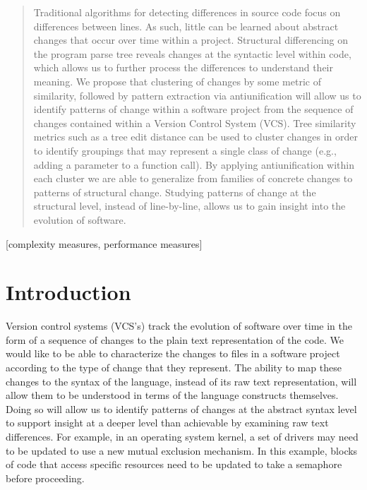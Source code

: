 \documentclass{acm_proc_article-sp}
\begin{document}
\maketitle
\begin{abstract}

Traditional algorithms for detecting differences in source code focus on
differences between lines.  As such, little can be learned about abstract
changes that occur over time within a project.  Structural differencing on the
program parse tree reveals changes at the syntactic level within code, which
allows us to further process the differences to understand their meaning. We
propose that clustering of changes by some metric of similarity, followed by
pattern extraction via antiunification will allow us to identify patterns of
change  within a software project from the sequence of changes contained
within a Version Control System (VCS). Tree similarity metrics such as a tree
edit distance can be used to cluster changes in order to identify groupings
that may represent a single class of change (e.g., adding a
parameter to a function call). By applying antiunification within each cluster
we are able to generalize from families of concrete changes to patterns of
structural change. Studying patterns of change at the structural level,
instead of line-by-line, allows us to gain insight into the evolution of
software.

\end{abstract}

[complexity measures, performance measures]



\section{Introduction}

Version control systems (VCS's) track the evolution of software over time in the form
of a sequence of changes to the plain text representation of the code.
We would like to be able to characterize the changes to files in a software
project according to the type of change that they represent.  The ability to
map these changes to the syntax of the language, instead of its raw text
representation, will allow them to be understood in terms of the language
constructs themselves.  Doing so will allow us to identify patterns of
changes at the abstract syntax level to support insight at a deeper level
than achievable by examining raw text differences.  For example, in
an operating system kernel, a set of drivers may need to be updated to use a
new mutual exclusion mechanism. In this example, blocks of code that access
specific resources need to be updated to take a semaphore before proceeding.
\end{document}
